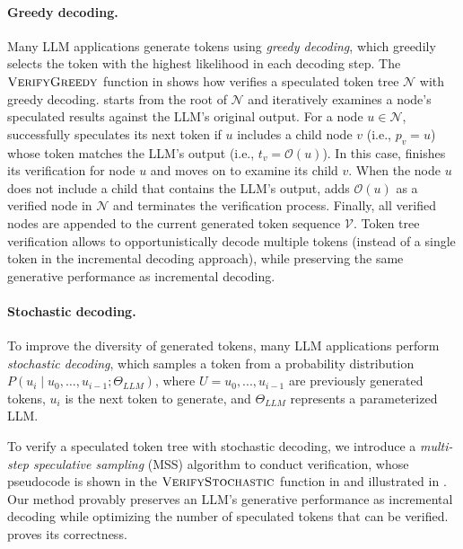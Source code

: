 \paragraph{Greedy decoding.}
Many LLM applications generate tokens using {\em greedy decoding}, which greedily selects the token with the highest likelihood in each decoding step.
The $\textproc{VerifyGreedy}$ function in  shows how \SpecInfer verifies a speculated token tree $\mathcal{N}$ with greedy decoding.
\SpecInfer starts from the root of $\mathcal{N}$ and iteratively examines a node's speculated results against the LLM's original output.
For a node $u\in\mathcal{N}$, \SpecInfer successfully speculates its next token if $u$ includes a child node $v$ (i.e., $p_v = u$) whose token matches the LLM's output (i.e., $t_v = \mathcal{O}(u)$).
In this case, \SpecInfer finishes its verification for node $u$ and moves on to examine its child $v$.
When the node $u$ does not include a child that contains the LLM's output, \SpecInfer adds $\mathcal{O}(u)$ as a verified node in $\mathcal{N}$ and terminates the verification process.
Finally, all verified nodes are appended to the current generated token sequence $\mathcal{V}$.
Token tree verification allows \SpecInfer to opportunistically decode multiple tokens (instead of a single token in the incremental decoding approach), while preserving the same generative performance as incremental decoding.

\paragraph{Stochastic decoding.}
To improve the diversity of generated tokens, many LLM applications perform {\em stochastic decoding}, which samples a token from a probability distribution $P(u_i \mid u_0, \ldots, u_{i-1}; \Theta_{LLM})$, where $U = u_0,...,u_{i-1}$ are previously generated tokens, $u_i$ is the next token to generate, and $\Theta_{LLM}$ represents a parameterized LLM.

To verify a speculated token tree with stochastic decoding, we introduce a {\em multi-step speculative sampling} (MSS) algorithm to conduct verification, whose pseudocode is shown in the $\textproc{VerifyStochastic}$ function in  and illustrated in .
Our method provably preserves an LLM's generative performance as incremental decoding while optimizing the number of speculated tokens that can be verified.
 proves its correctness.

